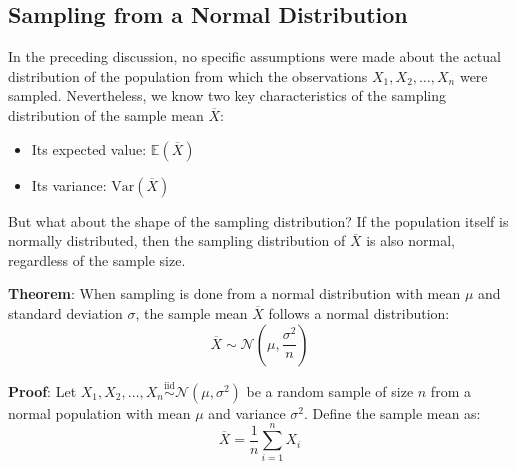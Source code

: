 \documentclass[twoside]{book}
\begin{document}



\subsection{Sampling from a Normal Distribution}
In the preceding discussion, no specific assumptions were made about the actual distribution of the population from which the observations \( X_1, X_2, \dots, X_n \) were sampled. Nevertheless, we know two key characteristics of the sampling distribution of the sample mean \( \overline{X} \):
\begin{itemize}
    \item Its expected value: \( \mathbb{E}(\overline{X}) \)
    \item Its variance: \( \mathrm{Var}(\overline{X})\)
\end{itemize}
But what about the shape of the sampling distribution? If the population itself is normally distributed, then the sampling distribution of \( \overline{X} \) is also normal, regardless of the sample size.

\begin{textbox}
\textbf{Theorem}: When sampling is done from a normal distribution with mean \( \mu \) and standard deviation \( \sigma \), the sample mean \( \overline{X} \) follows a normal distribution:
\[
\overline{X} \sim \mathcal{N}\left(\mu, \frac{\sigma^2}{n}\right)
\]
\end{textbox}
\textbf{Proof}: Let \( X_1, X_2, \dots, X_n \overset{\text{iid}}{\sim} \mathcal{N}(\mu, \sigma^2) \) be a random sample of size \( n \) from a normal population with mean \( \mu \) and variance \( \sigma^2 \). Define the sample mean as:
\[
\overline{X} = \frac{1}{n} \sum_{i=1}^{n} X_i
\]
\end{document}
